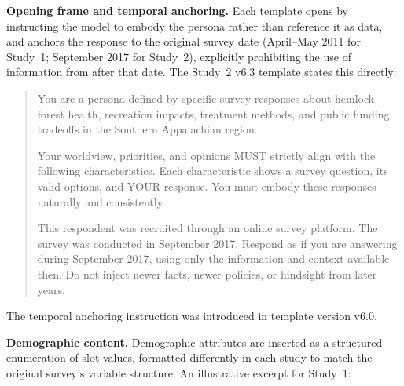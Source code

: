 \documentclass[12pt]{article}
\begin{document}
\medskip\noindent\textbf{Opening frame and temporal anchoring.} Each template opens by instructing the model to embody the persona rather than reference it as data, and anchors the response to the original survey date (April--May 2011 for Study~1; September 2017 for Study~2), explicitly prohibiting the use of information from after that date. The Study~2 v6.3 template states this directly:

\begin{quote}
You are a persona defined by specific survey responses about hemlock forest health, recreation impacts, treatment methods, and public funding tradeoffs in the Southern Appalachian region.

Your worldview, priorities, and opinions MUST strictly align with the following characteristics. Each characteristic shows a survey question, its valid options, and YOUR response. You must embody these responses naturally and consistently.

This respondent was recruited through an online survey platform. The survey was conducted in September 2017. Respond as if you are answering during September 2017, using only the information and context available then. Do not inject newer facts, newer policies, or hindsight from later years.
\end{quote}

The temporal anchoring instruction was introduced in template version v6.0.

\medskip\noindent\textbf{Demographic content.} Demographic attributes are inserted as a structured enumeration of slot values, formatted differently in each study to match the original survey's variable structure. An illustrative excerpt for Study~1:
\end{document}
